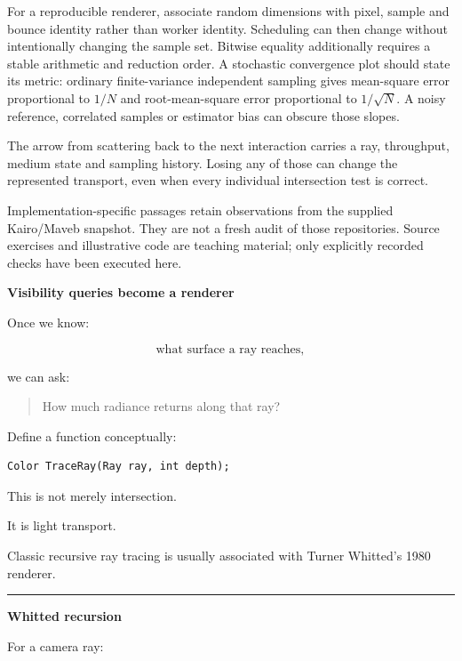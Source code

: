 For a reproducible renderer, associate random dimensions with pixel, sample and bounce identity rather than worker identity. Scheduling can then change without intentionally changing the sample set. Bitwise equality additionally requires a stable arithmetic and reduction order. A stochastic convergence plot should state its metric: ordinary finite-variance independent sampling gives mean-square error proportional to \(1/N\) and root-mean-square error proportional to \(1/\sqrt N\). A noisy reference, correlated samples or estimator bias can obscure those slopes.


The arrow from scattering back to the next interaction carries a ray, throughput, medium state and sampling history. Losing any of those can change the represented transport, even when every individual intersection test is correct.

Implementation-specific passages retain observations from the supplied Kairo/Maveb snapshot. They are not a fresh audit of those repositories. Source exercises and illustrative code are teaching material; only explicitly recorded checks have been executed here.

\textbf{Visibility queries become a renderer}

Once we know:

\[
\text{what surface a ray reaches},
\]

we can ask:

\begin{quote}
How much radiance returns along that ray?
\end{quote}

Define a function conceptually:

\begin{verbatim}
Color TraceRay(Ray ray, int depth);
\end{verbatim}

This is not merely intersection.

It is light transport.

Classic recursive ray tracing is usually associated with Turner Whitted's 1980 renderer.

\begin{center}\rule{0.5\linewidth}{0.5pt}\end{center}

\textbf{Whitted recursion}

For a camera ray:

